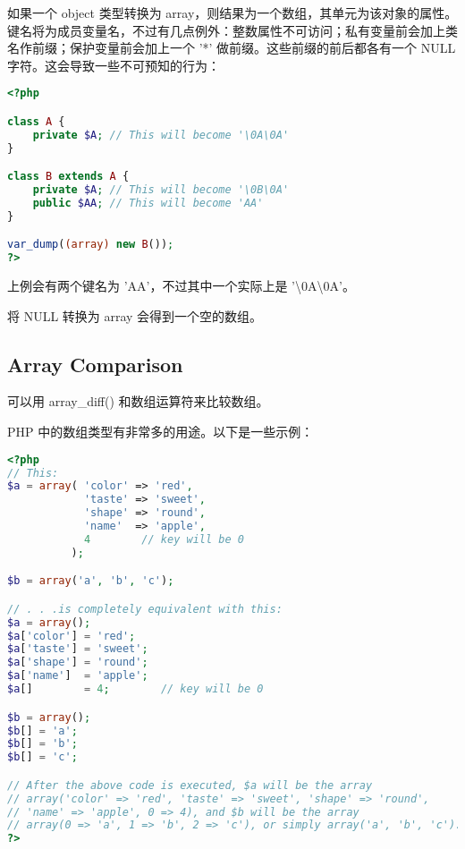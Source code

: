 如果一个 object 类型转换为 array，则结果为一个数组，其单元为该对象的属性。键名将为成员变量名，不过有几点例外：整数属性不可访问；私有变量前会加上类名作前缀；保护变量前会加上一个 '*' 做前缀。这些前缀的前后都各有一个 NULL 字符。这会导致一些不可预知的行为：







\begin{lstlisting}[language=PHP]
<?php

class A {
    private $A; // This will become '\0A\0A'
}

class B extends A {
    private $A; // This will become '\0B\0A'
    public $AA; // This will become 'AA'
}

var_dump((array) new B());
?>
\end{lstlisting}

上例会有两个键名为 'AA'，不过其中一个实际上是 '\textbackslash 0A\textbackslash 0A'。

将 NULL 转换为 array 会得到一个空的数组。


\subsection{Array Comparison}

可以用 array\_diff() 和数组运算符来比较数组。



PHP 中的数组类型有非常多的用途。以下是一些示例：




\begin{lstlisting}[language=PHP]
<?php
// This:
$a = array( 'color' => 'red',
            'taste' => 'sweet',
            'shape' => 'round',
            'name'  => 'apple',
            4        // key will be 0
          );

$b = array('a', 'b', 'c');

// . . .is completely equivalent with this:
$a = array();
$a['color'] = 'red';
$a['taste'] = 'sweet';
$a['shape'] = 'round';
$a['name']  = 'apple';
$a[]        = 4;        // key will be 0

$b = array();
$b[] = 'a';
$b[] = 'b';
$b[] = 'c';

// After the above code is executed, $a will be the array
// array('color' => 'red', 'taste' => 'sweet', 'shape' => 'round', 
// 'name' => 'apple', 0 => 4), and $b will be the array 
// array(0 => 'a', 1 => 'b', 2 => 'c'), or simply array('a', 'b', 'c').
?>
\end{lstlisting}


